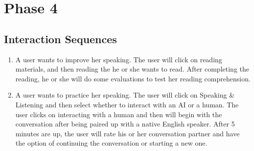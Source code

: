 \documentclass{sigchi}
\newcommand\tabhead[1]{\small\textbf{#1}}
\begin{document}



\section{Phase 4}


\subsection{Interaction Sequences}
\begin{enumerate}
\item A user wants to improve her speaking. The user will click on reading materials, and then reading the he or she wants to read. After completing the reading, he or she will do some evaluations to test her reading comprehension.
\item A user wants to practice her speaking. The user will click on Speaking \& Listening and then select whether to interact with an AI or a human. The user clicks on interacting with a human and then will begin with the conversation after being paired up with a native English speaker. After 5 minutes are up, the user will rate his or her conversation partner and have the option of continuing the conversation or starting a new one.
\end{enumerate}
\end{document}
